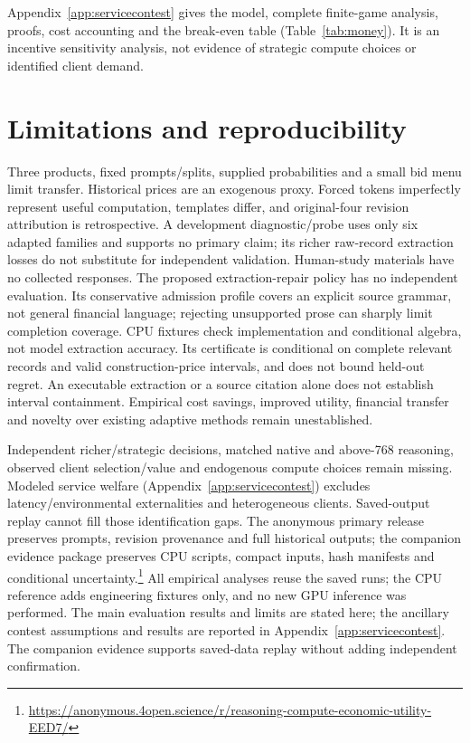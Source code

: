 \documentclass[sigconf,anonymous,nonacm]{acmart}
\begin{document}
Appendix~\ref{app:servicecontest} gives the model, complete finite-game analysis, proofs, cost accounting and the break-even table (Table~\ref{tab:money}). It is an incentive sensitivity analysis, not evidence of strategic compute choices or identified client demand.

\section{Limitations and reproducibility}\label{sec:limitations}
Three products, fixed prompts/splits, supplied probabilities and a small bid menu limit transfer. Historical prices are an exogenous proxy. Forced tokens imperfectly represent useful computation, templates differ, and original-four revision attribution is retrospective. A development diagnostic/probe uses only six adapted families and supports no primary claim; its richer raw-record extraction losses do not substitute for independent validation. Human-study materials have no collected responses.
The proposed extraction-repair policy has no independent evaluation. Its conservative admission profile covers an explicit source grammar, not general financial language; rejecting unsupported prose can sharply limit completion coverage. CPU fixtures check implementation and conditional algebra, not model extraction accuracy. Its certificate is conditional on complete relevant records and valid construction-price intervals, and does not bound held-out regret. An executable extraction or a source citation alone does not establish interval containment. Empirical cost savings, improved utility, financial transfer and novelty over existing adaptive methods remain unestablished.

Independent richer/strategic decisions, matched native and above-768 reasoning, observed client selection/value and endogenous compute choices remain missing. Modeled service welfare (Appendix~\ref{app:servicecontest}) excludes latency/environmental externalities and heterogeneous clients. Saved-output replay cannot fill those identification gaps. The anonymous primary release preserves prompts, revision provenance and full historical outputs; the companion evidence package preserves CPU scripts, compact inputs, hash manifests and conditional uncertainty.\footnote{\url{https://anonymous.4open.science/r/reasoning-compute-economic-utility-EED7/}} All empirical analyses reuse the saved runs; the CPU reference adds engineering fixtures only, and no new GPU inference was performed. The main evaluation results and limits are stated here; the ancillary contest assumptions and results are reported in Appendix~\ref{app:servicecontest}. The companion evidence supports saved-data replay without adding independent confirmation.
\end{document}
